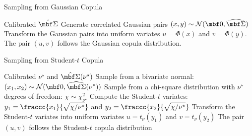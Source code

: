 \begin{algorithm}[H]
\label{alg:sampling_gaussian}
\caption{Sampling from Gaussian Copula}
\begin{algorithmic}[1]
\Require Calibrated $\hat{\mbf \Sigma}$ %
\State Generate correlated Gaussian pairs $(x,y)\sim\mathcal N(\mbf 0, \widehat{\mbf \Sigma})$
\State Transform the Gaussian pairs into uniform variates %
$u = \Phi(x)$ and $v = \Phi(y)$.
\Ensure The pair $(u,v)$  follows the Gaussian copula distribution.
\end{algorithmic}
\end{algorithm}

\begin{algorithm}[H]
\label{alg:sampling_student-t}
\caption{Sampling from Student-$t$ Copula}
\begin{algorithmic}[1]
\Require Calibrated $\nu^\star$ and $\hat{\mbf \Sigma}(\nu^\star)$ %
\State Sample from a bivariate normal: $\displaystyle (x_1, x_2) \sim \mathcal{N}(\mbf 0, \widehat{\mbf \Sigma}(\nu^{\star}))$ 
\State Sample from a chi-square distribution with $\nu^\star$ degrees of freedom: $\displaystyle \chi \sim \chi^2_{\nu^\star}$
\State Compute the Student-$t$ variates: $y_1 = \fraccc{x_1}{\sqrt{\chi/\nu^{\star}}}$ and $y_2 = \fraccc{x_2}{\sqrt{\chi/\nu^{\star}}}$
\State Transform the Student-$t$ variates into uniform variates %
$u = t_{\nu}(y_1)$ and $v = t_{\nu}(y_2)$ 
\Ensure The pair $(u,v)$ follows the Student-$t$ copula distribution
\end{algorithmic}
\end{algorithm}
